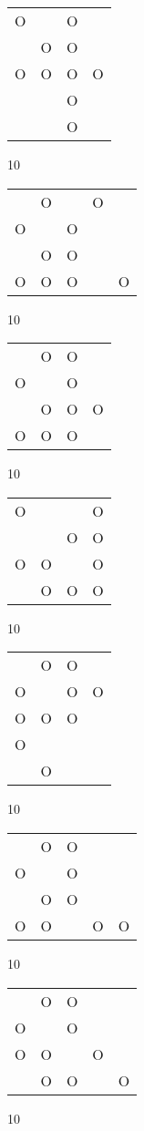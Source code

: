 \begin{tabular}{|m{0.2cm}m{0.2cm}m{0.2cm}m{0.2cm}|}\hline
O& &O& \\
 &O&O& \\
O&O&O&O\\
 & &O& \\
 & &O& \\
\hline\end{tabular}10
\begin{tabular}{|m{0.2cm}m{0.2cm}m{0.2cm}m{0.2cm}m{0.2cm}|}\hline
 &O& &O& \\
O& &O& & \\
 &O&O& & \\
O&O&O& &O\\
\hline\end{tabular}10
\begin{tabular}{|m{0.2cm}m{0.2cm}m{0.2cm}m{0.2cm}|}\hline
 &O&O& \\
O& &O& \\
 &O&O&O\\
O&O&O& \\
\hline\end{tabular}10
\begin{tabular}{|m{0.2cm}m{0.2cm}m{0.2cm}m{0.2cm}|}\hline
O& & &O\\
 & &O&O\\
O&O& &O\\
 &O&O&O\\
\hline\end{tabular}10
\begin{tabular}{|m{0.2cm}m{0.2cm}m{0.2cm}m{0.2cm}|}\hline
 &O&O& \\
O& &O&O\\
O&O&O& \\
O& & & \\
 &O& & \\
\hline\end{tabular}10
\begin{tabular}{|m{0.2cm}m{0.2cm}m{0.2cm}m{0.2cm}m{0.2cm}|}\hline
 &O&O& & \\
O& &O& & \\
 &O&O& & \\
O&O& &O&O\\
\hline\end{tabular}10
\begin{tabular}{|m{0.2cm}m{0.2cm}m{0.2cm}m{0.2cm}m{0.2cm}|}\hline
 &O&O& & \\
O& &O& & \\
O&O& &O& \\
 &O&O& &O\\
\hline\end{tabular}10
